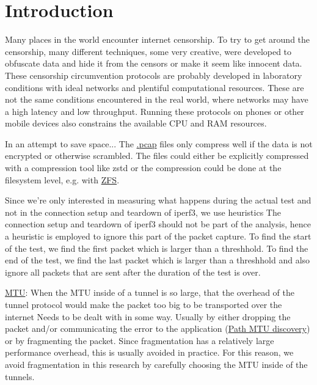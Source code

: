 
\chapter{Introduction}


Many places in the world encounter internet censorship. To try to get around the censorship, many different techniques, some very creative, were developed to obfuscate data and hide it from the censors or make it seem like innocent data. These censorship circumvention protocols are probably developed in laboratory conditions with ideal networks and plentiful computational resources. These are not the same conditions encountered in the real world, where networks may have a high latency and low throughput. Running these protocols on phones or other mobile devices also constrains the available CPU and RAM resources.



In an attempt to save space...
The \href{https://en.wikipedia.org/wiki/Pcap}{.pcap} files only compress well if the data is not encrypted or otherwise scrambled.
The files could either be explicitly compressed with a compression tool like zstd or the compression could be done at the filesystem level, e.g. with \href{https://openzfs.org/wiki/Main_Page}{ZFS}.


Since we're only interested in measuring what happens during the actual test and not in the connection setup and teardown of iperf3, we use heuristics
The connection setup and teardown of iperf3 should not be part of the analysis, hence a heuristic is employed to ignore this part of the packet capture. To find the start of the test, we find the first packet which is larger than a threshhold. To find the end of the test, we find the last packet which is larger than a threshhold and also ignore all packets that are sent after the duration of the test is over.

\href{https://en.wikipedia.org/wiki/Maximum_transmission_unit}{MTU}:
When the MTU inside of a tunnel is so large, that the overhead of the tunnel protocol would make the packet too big to be transported over the internet
Needs to be dealt with in some way. Usually by either dropping the packet and/or communicating the error to the application (\href{https://en.wikipedia.org/wiki/Path_MTU_Discovery}{Path MTU discovery}) or by fragmenting the packet. Since fragmentation has a relatively large performance overhead, this is usually avoided in practice. For this reason, we avoid fragmentation in this research by carefully choosing the MTU inside of the tunnels.


